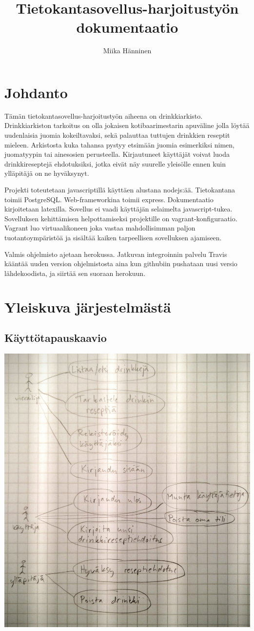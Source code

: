 \documentclass[a4paper]{article}
\title{Tietokantasovellus-harjoitustyön dokumentaatio}
\author{Miika Hänninen}
\begin{document}
\maketitle
\tableofcontents
\section{Johdanto}
Tämän tietokantasovellus-harjoitustyön aiheena on drinkkiarkisto. Drinkkiarkiston tarkoitus on olla jokaisen kotibaarimestarin apuväline jolla löytää uudenlaisia juomia kokeiltavaksi, sekä palauttaa tuttujen drinkkien reseptit mieleen. Arkistosta kuka tahansa pystyy etsimään juomia esimerkiksi nimen, juomatyypin tai ainesosien perusteella. Kirjautuneet käyttäjät voivat luoda drinkkireseptejä ehdotuksiksi, jotka eivät näy suurelle yleisölle ennen kuin ylläpitäjä on ne hyväksynyt.

Projekti toteutetaan javascriptillä käyttäen alustana nodejs:ää. Tietokantana toimii PostgreSQL. Web-frameworkina toimii express. Dokumentaatio kirjoitetaan latexilla. Sovellus ei vaadi käyttäjän selaimelta javascript-tukea. Sovelluksen kehittämisen helpottamiseksi projektille on vagrant-konfiguraatio. Vagrant luo virtuaalikoneen joka vastaa mahdollisimman paljon tuotantoympäristöä ja sisältää kaiken tarpeellisen sovelluksen ajamiseen. 

Valmis ohjelmisto ajetaan herokussa. Jatkuvan integroinnin palvelu Travis kääntää uuden version ohjelmistosta aina kun githubiin pushataan uusi versio lähdekoodista, ja siirtää sen suoraan herokuun.
\pagebreak
\section{Yleiskuva järjestelmästä}
\subsection{Käyttötapauskaavio}
\includegraphics[width=\textwidth]{usecase-diagram}
\end{document}
